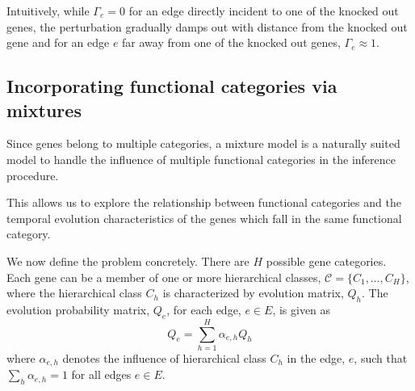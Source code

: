 \documentclass{bioinfo}
\begin{document}
\begin{methods}
 Intuitively, while $\Gamma_e = 0$ for an edge 
directly incident to one of the knocked out genes, the perturbation
gradually damps out with distance from the knocked out gene and for
an edge $e$ far away from one of the knocked out genes, $\Gamma_e
\approx 1$.%


\subsection{Incorporating functional categories via mixtures}
\label{sec:mixture-model}
Since genes belong
  to multiple categories, a mixture model is a naturally suited model
  to handle the influence of multiple functional categories in the
  inference procedure. 

This allows us to explore  the relationship between functional
categories and the temporal evolution characteristics of the genes
which fall in the same functional category.

We now define the problem concretely. There are $H$ possible gene
categories. Each gene can be a member of one or more hierarchical
classes, $\mathcal{C}=\{C_{1},\ldots , C_{H}\}$, where the
hierarchical class $C_{h}$ is characterized by evolution matrix,
$Q_{h}$. The evolution probability matrix, $Q_{e}$, for each edge,
$e\in E$, is given as 
\begin{equation}
  \label{eq:q-mixture}
  Q_{e} = \sum_{h=1}^{H} \alpha_{e,h} Q_{h}
\end{equation}
where $\alpha_{e,h}$ denotes the influence of hierarchical class
$C_{h}$ in the edge, $e$, such that $\sum_{h} \alpha_{e, h} = 1$
for all edges $e \in E$. 



\end{methods}
\end{document}
